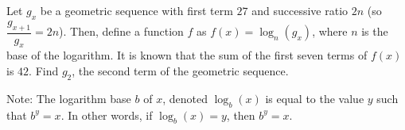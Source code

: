 Let $g_x$ be a geometric sequence with first term $27$ and successive ratio $2n$ (so $\dfrac{g_{x+1}}{g_x} = 2n$). Then, define a function $f$ as $f(x) = \log_n(g_x)$, where $n$ is the base of the logarithm. It is known that the sum of the first seven terms of $f(x)$ is $42$. Find $g_2$, the second term of the geometric sequence.

Note: The logarithm base $b$ of $x$, denoted $\log_b(x)$ is equal to the value $y$ such that $b^y = x$. In other words, if $\log_b(x) = y$, then $b^y = x$.
